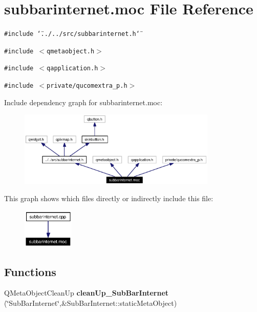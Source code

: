 \section{subbarinternet.moc File Reference}
\label{subbarinternet_8moc}


{\tt \#include \char`\"{}../../src/subbarinternet.h\char`\"{}}\par
{\tt \#include $<$qmetaobject.h$>$}\par
{\tt \#include $<$qapplication.h$>$}\par
{\tt \#include $<$private/qucomextra\_\-p.h$>$}\par


Include dependency graph for subbarinternet.moc:\begin{figure}[H]
\begin{center}
\leavevmode
\includegraphics[width=268pt]{subbarinternet_8moc__incl}
\end{center}
\end{figure}


This graph shows which files directly or indirectly include this file:\begin{figure}[H]
\begin{center}
\leavevmode
\includegraphics[width=69pt]{subbarinternet_8moc__dep__incl}
\end{center}
\end{figure}
\subsection*{Functions}
\begin{CompactItemize}
\item 
QMeta\-Object\-Clean\-Up {\bf clean\-Up\_\-Sub\-Bar\-Internet} (\char`\"{}Sub\-Bar\-Internet\char`\"{},\&Sub\-Bar\-Internet::static\-Meta\-Object)
\end{CompactItemize}


